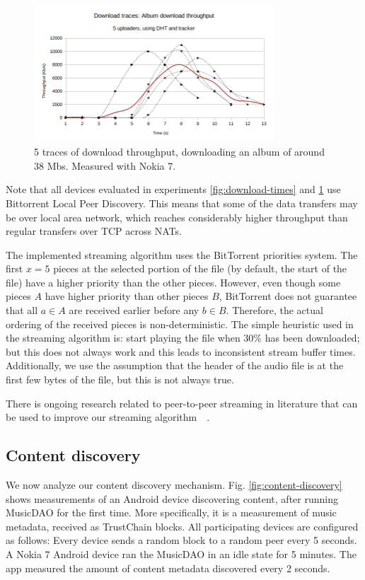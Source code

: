 \begin{figure}
    \centering
    \includegraphics[width=0.8\textwidth]{evaluation/download-traces.png}
    \caption{5 traces of download throughput, downloading an album of around 38 Mbs. Measured with Nokia 7.}
    \label{fig:download-traces}
\end{figure}

Note that all devices evaluated in experiments \ref{fig:download-times} and \ref{fig:download-traces} use Bittorrent Local Peer Discovery. This means that some of the data transfers may be over local area network, which reaches considerably higher throughput than regular transfers over TCP across NATs.

The implemented streaming algorithm uses the BitTorrent priorities system. The first $x=5$ pieces at the selected portion of the file (by default, the start of the file) have a higher priority than the other pieces. However, even though some pieces $A$ have higher priority than other pieces $B$, BitTorrent does not guarantee that all $a\in A$ are received earlier before any $b\in B$. Therefore, the actual ordering of the received pieces is non-deterministic. The simple heuristic used in the streaming algorithm is: start playing the file when 30\% has been downloaded; but this does not always work and this leads to inconsistent stream buffer times. Additionally, we use the assumption that the header of the audio file is at the first few bytes of the file, but this is not always true.

There is ongoing research related to peer-to-peer streaming in literature that can be used to improve our streaming algorithm~\citep{erman2008piece}~\citep{akkanen2017continuous}.

\subsection{Content discovery}
We now analyze our content discovery mechanism. Fig. \ref{fig:content-discovery} shows measurements of an Android device discovering content, after running MusicDAO for the first time. More specifically, it is a measurement of music metadata, received as TrustChain blocks. All participating devices are configured as follows: Every device sends a random block to a random peer every 5 seconds. A Nokia 7 Android device ran the MusicDAO in an idle state for 5 minutes. The app measured the amount of content metadata discovered every 2 seconds. 

